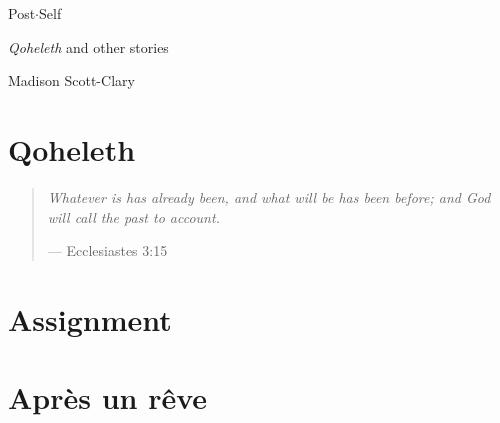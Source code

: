 \documentclass[11pt]{memoir}
\begin{document}
  \frontmatter

  

  \pagestyle{plain}

  \doublespacing

  \begin{flushright}
    \null
    \vfill
    {\Huge\DisplayFont Post$\cdot$Self}

    {\Large\DisplayFont \emph{Qoheleth} and other stories}

    \vfill

    {\Large\DisplayFont Madison Scott-Clary}
  \end{flushright}
  \thispagestyle{empty}

  \newpage

  

  \tableofcontents*
  \newpage
  \null
  \cleardoublepage

  \onehalfspacing


  \mainmatter

  \pagestyle{ourbook}

  \cleardoublepage
  \part*{Qoheleth}
  \null
  \thispagestyle{empty}
  \vfill
  \begin{quote}
    \emph{Whatever is has already been, and what will be has been before; and God will call the past to account.}

    --- Ecclesiastes 3:15
  \end{quote}
  \vfill
  
  
  
  

  \cleartoverso
  \part*{Assignment}
  

  \cleartoverso
  \part*{Après un rêve}
  
\end{document}
